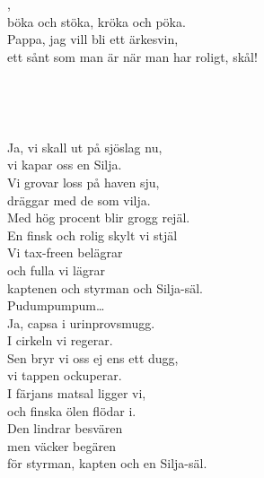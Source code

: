 \\


 \\       
\author{Text: ”Ärkesvinet” Janne Weijnitz }

,\\
böka och stöka, kröka och pöka.\\
Pappa, jag vill bli ett ärkesvin,\\
ett sånt som man är när man har roligt, skål!

\\

\newpage 


 \\       
\author{Text: Martin Johnsson}

\songtext{}Ja, vi skall ut på sjöslag nu,\\
vi kapar oss en Silja.\\
Vi grovar loss på haven sju,\\
dräggar med de som vilja.\\
Med hög procent blir grogg rejäl.\\
En finsk och rolig skylt vi stjäl\\
Vi tax-freen belägrar\\
och fulla vi lägrar\\
kaptenen och styrman och Silja-säl.\\
Pudumpumpum…\\
Ja, capsa i urinprovsmugg.\\
I cirkeln vi regerar.\\
Sen bryr vi oss ej ens ett dugg,\\
vi tappen ockuperar.\\
I färjans matsal ligger vi,\\
och finska ölen flödar i.\\
Den lindrar besvären\\
men väcker begären\\
för styrman, kapten och en Silja-säl.

